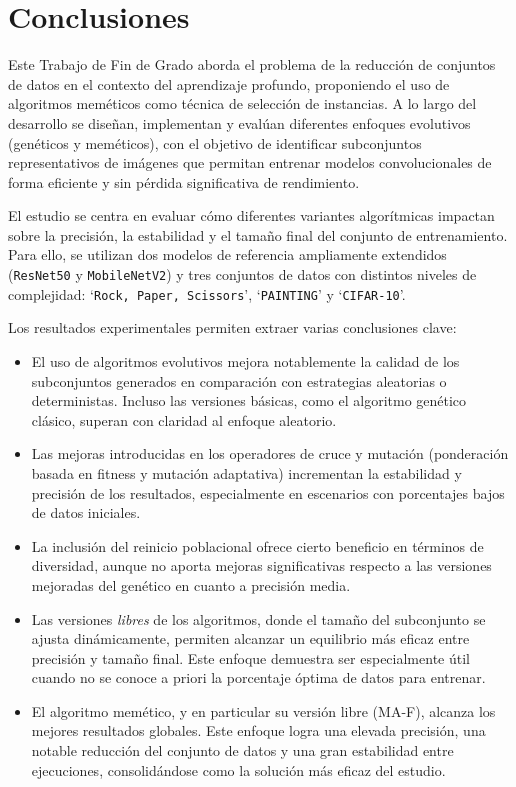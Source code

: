 
\chapter{Conclusiones}\label{ch:conclusiones}
Este Trabajo de Fin de Grado aborda el problema de la reducción de conjuntos de datos en el contexto del aprendizaje profundo,
proponiendo el uso de algoritmos meméticos como técnica de selección de instancias.
A lo largo del desarrollo se diseñan, implementan y evalúan diferentes enfoques evolutivos (genéticos y meméticos),
con el objetivo de identificar subconjuntos representativos de imágenes que permitan entrenar modelos convolucionales de forma eficiente y sin pérdida significativa de rendimiento.

El estudio se centra en evaluar cómo diferentes variantes algorítmicas impactan sobre la precisión, la estabilidad y el tamaño final del conjunto de entrenamiento.
Para ello, se utilizan dos modelos de referencia ampliamente extendidos (\texttt{ResNet50} y \texttt{MobileNetV2}) y tres conjuntos de datos con distintos niveles de complejidad: `\texttt{Rock, Paper, Scissors}', `\texttt{PAINTING}' y `\texttt{CIFAR-10}'.

Los resultados experimentales permiten extraer varias conclusiones clave:

\begin{itemize}
      \item El uso de algoritmos evolutivos mejora notablemente la calidad de los subconjuntos generados en comparación con estrategias aleatorias o deterministas.
            Incluso las versiones básicas, como el algoritmo genético clásico, superan con claridad al enfoque aleatorio.

      \item Las mejoras introducidas en los operadores de cruce y mutación (ponderación basada en fitness y mutación adaptativa)
            incrementan la estabilidad y precisión de los resultados, especialmente en escenarios con porcentajes bajos de datos iniciales.

      \item La inclusión del reinicio poblacional ofrece cierto beneficio en términos de diversidad,
            aunque no aporta mejoras significativas respecto a las versiones mejoradas del genético en cuanto a precisión media.

      \item Las versiones \textit{libres} de los algoritmos, donde el tamaño del subconjunto se ajusta dinámicamente,
            permiten alcanzar un equilibrio más eficaz entre precisión y tamaño final.
            Este enfoque demuestra ser especialmente útil cuando no se conoce a priori la porcentaje óptima de datos para entrenar.

      \item El algoritmo memético, y en particular su versión libre (MA-F), alcanza los mejores resultados globales.
            Este enfoque logra una elevada precisión, una notable reducción del conjunto de datos y una gran estabilidad entre ejecuciones,
            consolidándose como la solución más eficaz del estudio.
\end{itemize}


